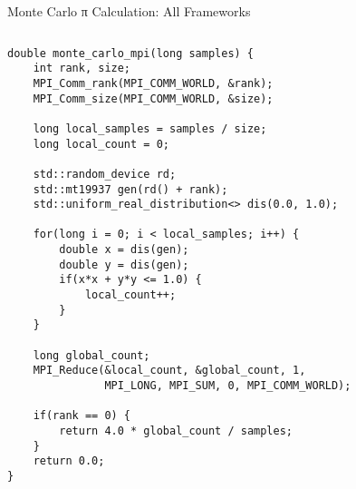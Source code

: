 \begin{frame}[fragile]{ Monte Carlo π Calculation: All Frameworks}
\begin{columns}
\begin{column}{0.35\textwidth}
\begin{verbatim}
double monte_carlo_mpi(long samples) {
    int rank, size;
    MPI_Comm_rank(MPI_COMM_WORLD, &rank);
    MPI_Comm_size(MPI_COMM_WORLD, &size);

    long local_samples = samples / size;
    long local_count = 0;

    std::random_device rd;
    std::mt19937 gen(rd() + rank);
    std::uniform_real_distribution<> dis(0.0, 1.0);

    for(long i = 0; i < local_samples; i++) {
        double x = dis(gen);
        double y = dis(gen);
        if(x*x + y*y <= 1.0) {
            local_count++;
        }
    }

    long global_count;
    MPI_Reduce(&local_count, &global_count, 1,
               MPI_LONG, MPI_SUM, 0, MPI_COMM_WORLD);

    if(rank == 0) {
        return 4.0 * global_count / samples;
    }
    return 0.0;
}
			\end{verbatim}
		\end{column}
	\end{columns}
\end{frame}

